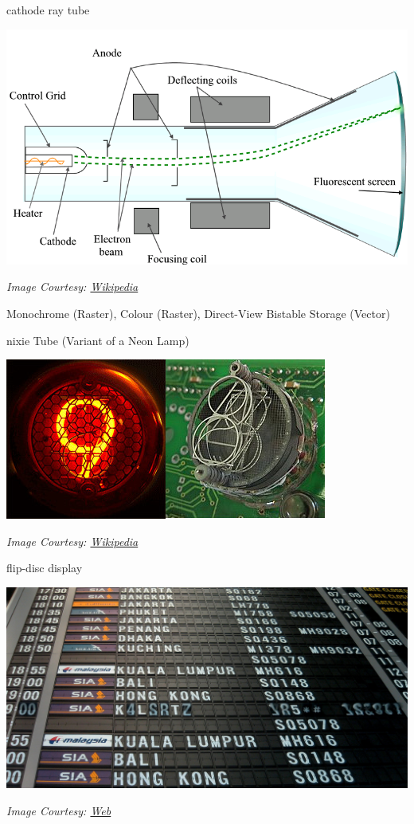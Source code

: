 \documentclass[aspectratio=169,xcolor={dvipsnames,svgnames}]{beamer}
\begin{document}
\begin{frame}[label={sec:orgc7251ec}]{cathode ray tube}
\centering

\begin{center}
\includegraphics[width=0.6\linewidth]{images/crt.png}
\end{center}
\emph{Image Courtesy: \href{https://en.wikipedia.org/wiki/File:Cathode\_ray\_Tube.PNG}{Wikipedia}}

Monochrome (Raster), Colour (Raster), Direct-View
Bistable Storage (Vector)
\end{frame}

\begin{frame}[label={sec:org3ce078f}]{nixie Tube}
(Variant of a Neon Lamp)
\centering

\begin{center}
\includegraphics[width=0.6\linewidth]{images/Nixie2.jpg}
\end{center}
\emph{Image Courtesy: \href{https://en.wikipedia.org/wiki/Nixie\_tube}{Wikipedia}}
\end{frame}

\begin{frame}[label={sec:org7398779}]{flip-disc display}
\centering

\begin{center}
\includegraphics[width=0.8\linewidth]{images/Changi-T2-Flipboard-2.jpg}
\end{center}
\emph{Image Courtesy: \href{https://mainlymiles.com/2020/01/17/changis-iconic-flip-board-displays-to-go-as-terminal-2-revamp-gets-underway/}{Web}}
\end{frame}
\end{document}
